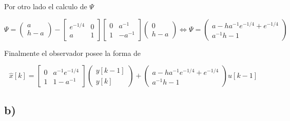 \documentclass[11pt,a4paper]{article}
\begin{document}
        Por otro lado el calculo de $\Psi$

        \begin{equation}
            \Psi = 
            \begin{pmatrix}
                a \\ h -a
            \end{pmatrix}
            -
            \begin{bmatrix}
                e^{-1/4} & 0 \\
                a & 1
            \end{bmatrix}
            \begin{bmatrix}
                0 & a^{-1} \\
                1 & -a^{-1}
            \end{bmatrix}
            \begin{pmatrix}
                0 \\
                h-a                
            \end{pmatrix}
            \Leftrightarrow
            \Psi = 
            \begin{pmatrix}
                a - ha^{-1}e^{-1/4} + e^{-1/4} 
                \\ a^{-1}h -1
            \end{pmatrix}
        \end{equation}

        Finalmente el observador posee la forma de 

        \begin{equation}
            \hat{x}[k] = 
            \begin{bmatrix}
                0 & a^{-1}e^{-1/4} \\
                1 & 1 - a^{-1}    
            \end{bmatrix}
            \begin{pmatrix}
                y[k-1] \\ y[k]
            \end{pmatrix}
            +
            \begin{pmatrix}
                a - ha^{-1}e^{-1/4} + e^{-1/4}  \\ a^{-1}h - 1
            \end{pmatrix}
            u[k-1]
        \end{equation}
    
    \subsection*{b)}
\end{document}
